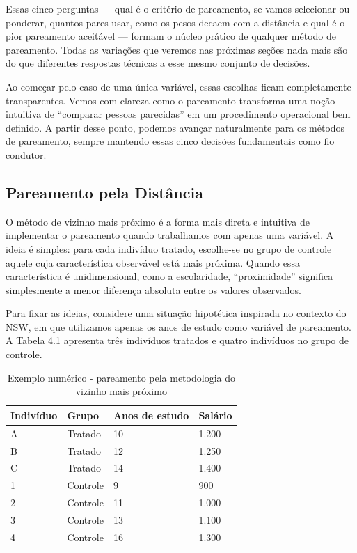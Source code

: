 Essas cinco perguntas — qual é o critério de pareamento, se vamos selecionar ou ponderar, quantos pares usar, como os pesos decaem com a distância e qual é o pior pareamento aceitável — formam o núcleo prático de qualquer método de pareamento. Todas as variações que veremos nas próximas seções nada mais são do que diferentes respostas técnicas a esse mesmo conjunto de decisões.

Ao começar pelo caso de uma única variável, essas escolhas ficam completamente transparentes. Vemos com clareza como o pareamento transforma uma noção intuitiva de “comparar pessoas parecidas” em um procedimento operacional bem definido. A partir desse ponto, podemos avançar naturalmente para os métodos de pareamento, sempre mantendo essas cinco decisões fundamentais como fio condutor.

\subsection{Pareamento pela Distância}

O método de vizinho mais próximo é a forma mais direta e intuitiva de implementar o pareamento quando trabalhamos com apenas uma variável. A ideia é simples: para cada indivíduo tratado, escolhe-se no grupo de controle aquele cuja característica observável está mais próxima. Quando essa característica é unidimensional, como a escolaridade, “proximidade” significa simplesmente a menor diferença absoluta entre os valores observados.

Para fixar as ideias, considere uma situação hipotética inspirada no contexto do NSW, em que utilizamos apenas os anos de estudo como variável de pareamento. A Tabela 4.1 apresenta três indivíduos tratados e quatro indivíduos no grupo de controle.

\begin{table}[h]
    \centering
    \begin{tabular}{llll}
        Indivíduo & Grupo & Anos de estudo & Salário\\\midrule
        A & Tratado  & 10 & 1.200  \\
        B & Tratado  & 12 & 1.250  \\
        C & Tratado  & 14 & 1.400  \\
        1 & Controle &  9 & 900  \\
        2 & Controle & 11 & 1.000  \\
        3 & Controle & 13 & 1.100  \\
        4 & Controle & 16 & 1.300  \\\bottomrule
    \end{tabular}
    \caption{Exemplo numérico - pareamento pela metodologia do vizinho mais próximo}
    \label{tab:placeholder}
\end{table}

